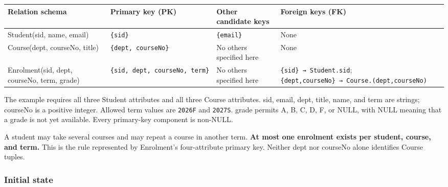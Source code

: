 \begin{longtable}[]{@{}
  >{\raggedright\arraybackslash}p{}
  >{\raggedright\arraybackslash}p{}
  >{\raggedright\arraybackslash}p{}
  >{\raggedright\arraybackslash}p{}@{}}
\toprule\noalign{}
\begin{minipage}[b]{\linewidth}\raggedright
Relation schema
\end{minipage} & \begin{minipage}[b]{\linewidth}\raggedright
Primary key (PK)
\end{minipage} & \begin{minipage}[b]{\linewidth}\raggedright
Other candidate keys
\end{minipage} & \begin{minipage}[b]{\linewidth}\raggedright
Foreign keys (FK)
\end{minipage} \\
\midrule\noalign{}
\endhead
\bottomrule\noalign{}
\endlastfoot
Student(sid, name, email) & \texttt{\{sid\}} & \texttt{\{email\}} & None \\
Course(dept, courseNo, title) & \texttt{\{dept,\ courseNo\}} & No others specified here & None \\
Enrolment(sid, dept, courseNo, term, grade) & \texttt{\{sid,\ dept,\ courseNo,\ term\}} & No others specified here & \texttt{\{sid\}\ →\ Student.sid}; \texttt{\{dept,courseNo\}\ →\ Course.\allowbreak{}(dept,\allowbreak{}courseNo)} \\
\end{longtable}

The example requires all three Student attributes and all three Course attributes. sid, email, dept, title, name, and term are strings; courseNo is a positive integer. Allowed term values are \texttt{2026F} and \texttt{2027S}. grade permits A, B, C, D, F, or NULL, with NULL meaning that a grade is not yet available. Every primary-key component is non-NULL.

A student may take several courses and may repeat a course in another term. \textbf{At most one enrolment exists per student, course, and term.} This is the rule represented by Enrolment's four-attribute primary key. Neither dept nor courseNo alone identifies Course tuples.

\subsubsection{Initial state}\label{03_relational_model_and_integrity_en-initial-state}

